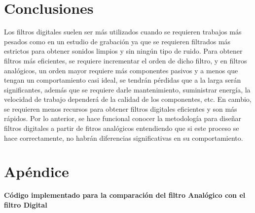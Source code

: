 \documentclass[12pt]{article}
\begin{document}
\section{Conclusiones}
Los filtros digitales suelen ser más utilizados cuando se requieren trabajos más pesados como en un estudio de grabación ya que se requieren filtrados más estrictos para obtener sonidos limpios y sin ningún tipo de ruido. Para obtener filtros más eficientes, se requiere incrementar el orden de dicho filtro, y en filtros analógicos, un orden mayor requiere más componentes pasivos y a menos que tengan un comportamiento casi ideal, se tendrán pérdidas que a la larga serán significantes, además que se requiere darle mantenimiento, suministrar energía, la velocidad de trabajo dependerá de la calidad de los componentes, etc. En cambio, se requieren menos recursos para obtener filtros digitales eficientes y son más rápidos. Por lo anterior, se hace funcional conocer la metodología para diseñar filtros digitales a partir de fitros analógicos entendiendo que si este proceso se hace correctamente, no habrán diferencias significativas en su comportamiento.
\section{Apéndice}
\textbf{Código implementado para la comparación del filtro Analógico con el filtro Digital}

\end{document}
